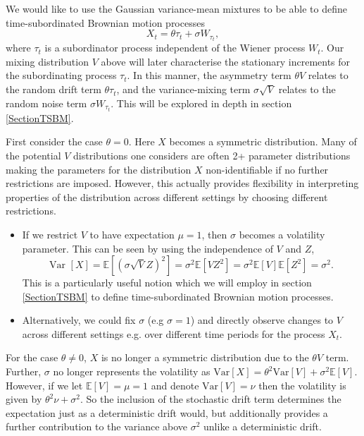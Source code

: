 \documentclass{article}
\begin{document}
We would like to use the Gaussian variance-mean mixtures to be able to define time-subordinated Brownian motion processes 
\begin{equation}\label{TSBMearly}
    X_t = \theta \tau_t + \sigma W_{\tau_t},
\end{equation} where $\tau_t$ is a subordinator process independent of the Wiener process $W_t$. Our mixing distribution $V$ above will later characterise the stationary increments for the subordinating process $\tau_t$.
In this manner, the asymmetry term $\theta V$ relates to the random drift term $\theta\tau_t$, and the variance-mixing term $\sigma \sqrt{V}$ relates to the random noise term $\sigma W_{\tau_t}$. This will be explored in depth in section \ref{SectionTSBM}.
\begin{remark}\label{SVGdefremark}
    First consider the case $\theta=0$. Here $X$ becomes a symmetric distribution. Many of the potential $V$ distributions one considers are often 2+ parameter distributions making the parameters for the distribution $X$ non-identifiable if no further restrictions are imposed. However, this actually provides flexibility in interpreting properties of the distribution across different settings by choosing different restrictions.
    \begin{itemize}
        \item  If we restrict $V$ to have expectation $\mu = 1$, then $\sigma$ becomes a volatility parameter. This can be seen by using the independence of $V$ and $Z$,
        \begin{equation}
            \text{Var }[X] = \mathbb{E}\left[\left(\sigma\sqrt{V}Z\right)^2\right] = \sigma^2\mathbb{E}\left[{V}Z^2\right] = \sigma^2\mathbb{E}[V]\mathbb{E}\left[Z^2\right] = \sigma^2.
        \end{equation}
        This is a particularly useful notion which we will employ in section \ref{SectionTSBM} to define time-subordinated Brownian motion processes. 
        
        \item Alternatively, we could fix $\sigma$ (e.g $\sigma=1$) and directly observe changes to $V$ across different settings e.g. over different time periods for the process $X_t$.
    \end{itemize}

    For the case $\theta\neq0$, $X$ is no longer a symmetric distribution due to the $\theta V$ term. Further, $\sigma$ no longer represents the volatility as $\text{Var}[X] = \theta^2\text{Var}[V] + \sigma^2\mathbb{E}[V]$. However, if we let $\mathbb{E}[V] = \mu = 1$ and denote $\text{Var}[V] = \nu$ then the volatility is given by $\theta^2\nu + \sigma^2$. So the inclusion of the stochastic drift term determines the expectation just as a deterministic drift would, but additionally provides a further contribution to the variance above $\sigma^2$ unlike a deterministic drift.
\end{remark}
\end{document}

